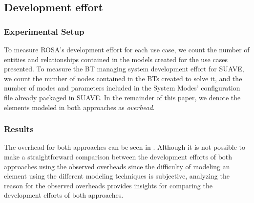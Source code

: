 \subsection{Development effort}

\subsubsection{Experimental Setup}
To measure ROSA's development effort for each use case, we count the number of entities and relationships contained in the models created for the use cases presented. To measure the BT managing system development effort for SUAVE,  we count the number of nodes contained in the BTs created to solve it, and the number of modes and parameters included in the System Modes' configuration file already packaged in SUAVE\@. In the remainder of this paper, we denote the elements modeled in both approaches as \emph{overhead}.

\subsubsection{Results}  The overhead for both approaches can be seen in . Although it is not possible to make a straightforward comparison between the development efforts of both approaches using the observed overheads since the difficulty of modeling an element using the different modeling techniques is subjective, analyzing the reason for the observed overheads provides insights for comparing the development efforts of both approaches.


